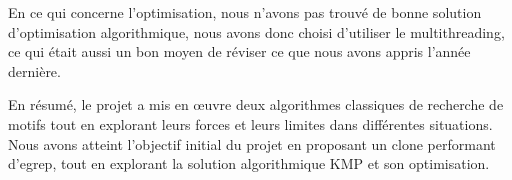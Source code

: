 \documentclass[11pt,english]{article}
\begin{document}
\indent En ce qui concerne l'optimisation, nous n'avons pas trouvé de bonne solution d'optimisation algorithmique, nous avons donc choisi d'utiliser le multithreading, ce qui était aussi un bon moyen de réviser ce que nous avons appris l'année dernière.

\indent En résumé, le projet a mis en œuvre deux algorithmes classiques de recherche de motifs tout en explorant leurs forces et leurs limites dans différentes situations. Nous avons atteint l'objectif initial du projet en proposant un clone performant d'egrep, tout en explorant la solution algorithmique KMP et son optimisation.
\end{document}
